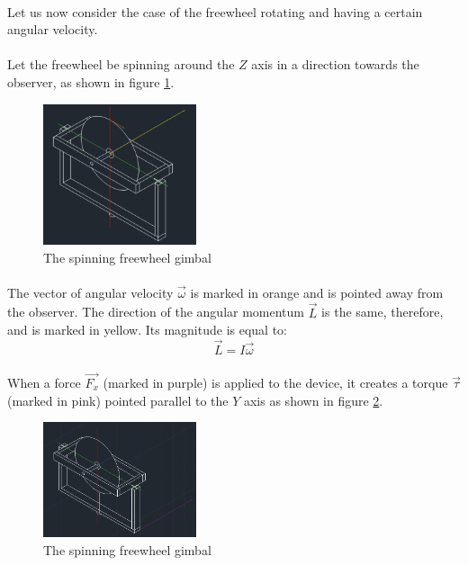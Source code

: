 \documentclass[a4paper]{article}
\begin{document}
\paragraph*{}
Let us now consider the case of the freewheel rotating and having a certain
angular velocity.

\paragraph*{}
Let the freewheel be spinning around the $Z$ axis in a direction towards the
observer, as shown in figure \ref{fig:gimbal-fw-1}.

\begin{figure}[ht]
  \centering
  \includegraphics[width=0.4\textwidth]{img/gimbal-fw-1}
  \caption{The spinning freewheel gimbal}
  \label{fig:gimbal-fw-1}
\end{figure}

\paragraph*{}
The vector of angular velocity $\vec{\omega}$ is marked in orange and is
pointed away from the observer. The direction of the angular momentum $\vec{L}$
is the same, therefore, and is marked in yellow. Its magnitude is equal to:
$$\vec{L} = I \vec{\omega}$$

\paragraph*{}
When a force $\vec{F_x}$ (marked in purple) is applied to the device, it
creates a torque $\vec{\tau}$ (marked in pink) pointed parallel to the $Y$ axis
as shown in figure \ref{fig:gimbal-fw-2}.

\begin{figure}[ht]
  \centering
  \includegraphics[width=0.4\textwidth]{img/gimbal-fw-2}
  \caption{The spinning freewheel gimbal}
  \label{fig:gimbal-fw-2}
\end{figure}
\end{document}
